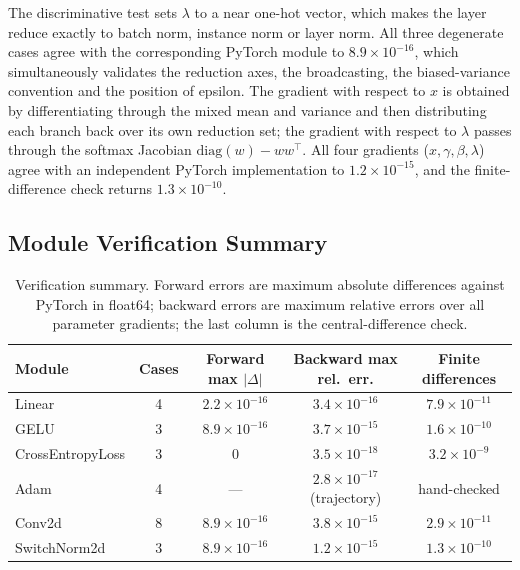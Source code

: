 The discriminative test sets $\lambda$ to a near one-hot vector, which makes the layer reduce exactly
to batch norm, instance norm or layer norm. All three degenerate cases agree with the corresponding
PyTorch module to $8.9\times10^{-16}$, which simultaneously validates the reduction axes, the
broadcasting, the biased-variance convention and the position of epsilon. The gradient with respect
to $x$ is obtained by differentiating through the mixed mean and variance and then distributing each
branch back over its own reduction set; the gradient with respect to $\lambda$ passes through the
softmax Jacobian $\mathrm{diag}(w)-ww^{\top}$. All four gradients ($x,\gamma,\beta,\lambda$) agree
with an independent PyTorch implementation to $1.2\times10^{-15}$, and the finite-difference check
returns $1.3\times10^{-10}$.

\subsection{Module Verification Summary}

\begin{table}[t]
\centering
\caption{Verification summary. Forward errors are maximum absolute differences against PyTorch in
float64; backward errors are maximum relative errors over all parameter gradients; the last column is
the central-difference check.}
\label{tab:partb-verification}
\begin{tabular}{@{}lcccc@{}}
\toprule
Module & Cases & Forward max $\lvert\Delta\rvert$ & Backward max rel.\ err. & Finite differences \\
\midrule
Linear           & 4 & $2.2\times10^{-16}$ & $3.4\times10^{-16}$ & $7.9\times10^{-11}$ \\
GELU             & 3 & $8.9\times10^{-16}$ & $3.7\times10^{-15}$ & $1.6\times10^{-10}$ \\
CrossEntropyLoss & 3 & $0$                 & $3.5\times10^{-18}$ & $3.2\times10^{-9}$  \\
Adam             & 4 & ---                 & $2.8\times10^{-17}$ (trajectory) & hand-checked \\
Conv2d           & 8 & $8.9\times10^{-16}$ & $3.8\times10^{-15}$ & $2.9\times10^{-11}$ \\
SwitchNorm2d     & 3 & $8.9\times10^{-16}$ & $1.2\times10^{-15}$ & $1.3\times10^{-10}$ \\
\bottomrule
\end{tabular}
\end{table}

